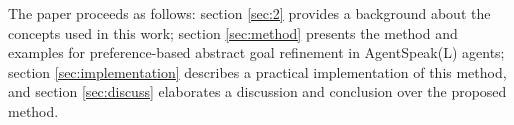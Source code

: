 The paper proceeds as follows: section \ref{sec:2} provides a background about the concepts used in this work; section \ref{sec:method} presents the method and examples for preference-based abstract goal refinement in AgentSpeak(L) agents; section \ref{sec:implementation} describes a practical implementation of this method, and section \ref{sec:discuss} elaborates a discussion and conclusion over the proposed method. 




